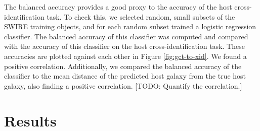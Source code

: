 \documentclass[fleqn,usenatbib,usedcolumn]{mnras}
\begin{document}
    The balanced accuracy provides a good proxy to the accuracy of the host
    cross-identification task. To check this, we selected random, small
    subsets of the SWIRE training objects, and for each random subset trained
    a logistic regression classifier. The balanced accuracy of this classifier
    was computed and compared with the accuracy of this classifier on the host
    cross-identification task. These accuracies are plotted against each other
    in Figure \ref{fig:gct-to-xid}. We found a positive correlation.
    Additionally, we compared the balanced accuracy of the classifier to the
    mean distance of the predicted host galaxy from the true host galaxy, also
    finding a positive correlation. [TODO: Quantify the correlation.]

\section{Results}\label{results}
\end{document}
